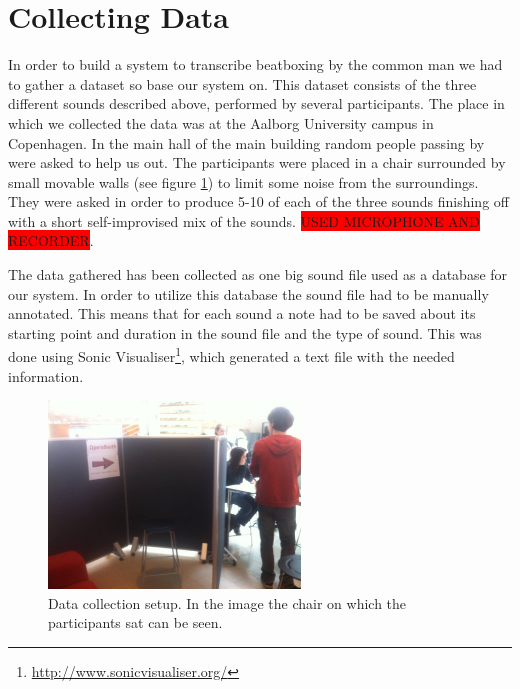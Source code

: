 \section{Collecting Data}
\label{sec:collecting-data}
In order to build a system to transcribe beatboxing by the common man we had to gather a dataset so base our system on. This dataset consists of the three different sounds described above, performed by several participants. The place in which we collected the data was at the Aalborg University campus in Copenhagen. In the main hall of the main building random people passing by were asked to help us out. The participants were placed in a chair surrounded by small movable walls (see figure \ref{data-collection-pic}) to limit some noise from the surroundings. They were asked in order to produce 5-10 of each of the three sounds finishing off with a short self-improvised mix of the sounds. \colorbox{red}{USED MICROPHONE AND RECORDER}.

The data gathered has been collected as one big sound file used as a database for our system. In order to utilize this database the sound file had to be manually annotated. This means that for each sound a note had to be saved about its starting point and duration in the sound file and the type of sound. This was done using Sonic Visualiser\footnote{\url{http://www.sonicvisualiser.org/}}, which generated a text file with the needed information.

\begin{figure}[h]
	\begin{center}
		\includegraphics[height=5cm]{fig/dataset_collection.JPG}
		\caption{Data collection setup. In the image the chair on which the participants sat can be seen.}
		\label{data-collection-pic}
	\end{center}
\end{figure}